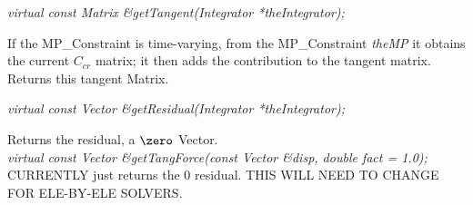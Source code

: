 {\em virtual const Matrix \&getTangent(Integrator *theIntegrator);} 

If the MP\_Constraint is time-varying, from the MP\_Constraint
{\em theMP} it obtains the current $C_{cr}$ matrix; it then adds the
contribution to the tangent matrix. Returns this tangent Matrix.

{\em virtual const Vector \&getResidual(Integrator *theIntegrator);} 

Returns the residual, a $\zero$ Vector. \\

{\em virtual const Vector \&getTangForce(const Vector \&disp, double
fact = 1.0);    }\\
CURRENTLY just returns the $0$ residual. THIS WILL NEED TO CHANGE FOR
ELE-BY-ELE SOLVERS. 

